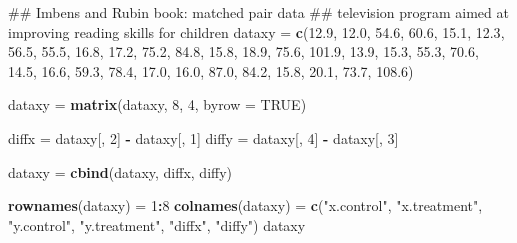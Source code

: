 \documentclass[]{article}
\newenvironment{Shaded}{\begin{snugshade}}{\end{snugshade}}
\newcommand{\KeywordTok}[1]{\textcolor[rgb]{0.13,0.29,0.53}{\textbf{#1}}}
\newcommand{\DataTypeTok}[1]{\textcolor[rgb]{0.13,0.29,0.53}{#1}}
\newcommand{\DecValTok}[1]{\textcolor[rgb]{0.00,0.00,0.81}{#1}}
\newcommand{\FloatTok}[1]{\textcolor[rgb]{0.00,0.00,0.81}{#1}}
\newcommand{\StringTok}[1]{\textcolor[rgb]{0.31,0.60,0.02}{#1}}
\newcommand{\OtherTok}[1]{\textcolor[rgb]{0.56,0.35,0.01}{#1}}
\newcommand{\OperatorTok}[1]{\textcolor[rgb]{0.81,0.36,0.00}{\textbf{#1}}}
\newcommand{\NormalTok}[1]{#1}
\begin{document}
\begin{Shaded}
\begin{Highlighting}[]
\NormalTok{## Imbens and Rubin book: matched pair data}
\NormalTok{## television program aimed at improving reading skills for children}
\NormalTok{dataxy =}\StringTok{ }\KeywordTok{c}\NormalTok{(}\FloatTok{12.9}\NormalTok{, }\FloatTok{12.0}\NormalTok{, }\FloatTok{54.6}\NormalTok{, }\FloatTok{60.6}\NormalTok{,}
           \FloatTok{15.1}\NormalTok{, }\FloatTok{12.3}\NormalTok{, }\FloatTok{56.5}\NormalTok{, }\FloatTok{55.5}\NormalTok{,}
           \FloatTok{16.8}\NormalTok{, }\FloatTok{17.2}\NormalTok{, }\FloatTok{75.2}\NormalTok{, }\FloatTok{84.8}\NormalTok{,}
           \FloatTok{15.8}\NormalTok{, }\FloatTok{18.9}\NormalTok{, }\FloatTok{75.6}\NormalTok{, }\FloatTok{101.9}\NormalTok{,}
           \FloatTok{13.9}\NormalTok{, }\FloatTok{15.3}\NormalTok{, }\FloatTok{55.3}\NormalTok{, }\FloatTok{70.6}\NormalTok{,}
           \FloatTok{14.5}\NormalTok{, }\FloatTok{16.6}\NormalTok{, }\FloatTok{59.3}\NormalTok{, }\FloatTok{78.4}\NormalTok{,}
           \FloatTok{17.0}\NormalTok{, }\FloatTok{16.0}\NormalTok{, }\FloatTok{87.0}\NormalTok{, }\FloatTok{84.2}\NormalTok{,}
           \FloatTok{15.8}\NormalTok{, }\FloatTok{20.1}\NormalTok{, }\FloatTok{73.7}\NormalTok{, }\FloatTok{108.6}\NormalTok{)}
           
\NormalTok{dataxy =}\StringTok{ }\KeywordTok{matrix}\NormalTok{(dataxy, }\DecValTok{8}\NormalTok{, }\DecValTok{4}\NormalTok{,  }\DataTypeTok{byrow =} \OtherTok{TRUE}\NormalTok{)           }

\NormalTok{diffx =}\StringTok{ }\NormalTok{dataxy[, }\DecValTok{2}\NormalTok{] }\OperatorTok{-}\StringTok{ }\NormalTok{dataxy[, }\DecValTok{1}\NormalTok{]}
\NormalTok{diffy =}\StringTok{ }\NormalTok{dataxy[, }\DecValTok{4}\NormalTok{] }\OperatorTok{-}\StringTok{ }\NormalTok{dataxy[, }\DecValTok{3}\NormalTok{]}

\NormalTok{dataxy =}\StringTok{ }\KeywordTok{cbind}\NormalTok{(dataxy, diffx, diffy)}

\KeywordTok{rownames}\NormalTok{(dataxy) =}\StringTok{ }\DecValTok{1}\OperatorTok{:}\DecValTok{8}
\KeywordTok{colnames}\NormalTok{(dataxy) =}\StringTok{ }\KeywordTok{c}\NormalTok{(}\StringTok{"x.control"}\NormalTok{, }\StringTok{"x.treatment"}\NormalTok{, }
                     \StringTok{"y.control"}\NormalTok{, }\StringTok{"y.treatment"}\NormalTok{,}
                     \StringTok{"diffx"}\NormalTok{, }\StringTok{"diffy"}\NormalTok{)}
\NormalTok{dataxy}
\end{Highlighting}
\end{Shaded}
\end{document}
